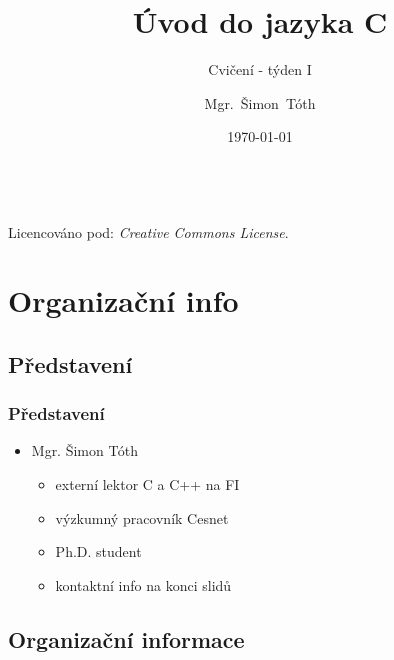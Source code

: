 

\title{Úvod do jazyka C}
\subtitle{Cvičení - týden I}
\author[]{Mgr.~Šimon~Tóth}
\date{\today}

\newcommand{\CcNote}[1]{%
        Licencováno pod: \textit{Creative Commons #1 3.0 License}.%
}


	\begin{frame}
		\titlepage
		\vfill
		\begin{center}
			\\
			{\tiny\CcNote{\CcLongnameByNcSa}}
			\vspace*{2ex}
		\end{center}
	\end{frame}

\section{Organizační info}
\subsection{Představení}

\begin{frame}
	\frametitle{Představení}
	\begin{itemize}
		\item{Mgr. Šimon Tóth}
		\begin{itemize}
			\item{externí lektor C a C++ na FI}
			\item{výzkumný pracovník Cesnet}
			\item{Ph.D. student}
			\item{kontaktní info na konci slidů}
		\end{itemize}
	\end{itemize}
\end{frame}

\subsection{Organizační informace}

